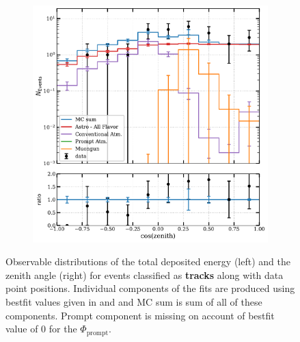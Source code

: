 \begin{figure}[h!]
\begin{subfigure}[h]{0.7\textwidth}
        \includegraphics{./figures/results/DataMC_IC86_pass2_SnowStorm_v2_Bfr_Tracks_zenith.pdf}
       
    \end{subfigure}%
    \caption{Observable distributions of the total deposited energy (left) and the zenith angle (right) for events classified as \textbf{tracks} along with data point positions. Individual components of the fits are produced using bestfit values given in  and  and MC sum is sum of all of these components. Prompt component is missing on account of bestfit value of 0 for the $\Phi_{\mathrm{prompt}}$.}
\end{figure}
\newpage
